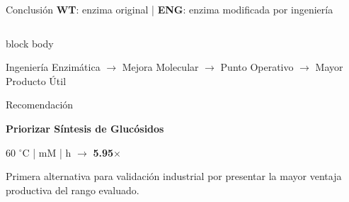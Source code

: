 \begin{frame}[label=conclusion]{Conclusión \hfill{\tiny\color{TextoSuave}\textbf{WT}: enzima original \quad | \quad \textbf{ENG}: enzima modificada por ingeniería}}
\begin{columns}[T,onlytextwidth]
\end{columns}

\vspace{0.04cm}

\begin{beamercolorbox}[
    wd=\linewidth,
    sep=0.08cm,
    rounded=true,
    center
]{block body}
\scriptsize\bfseries\color{CianClaro}

Ingeniería Enzimática
$\rightarrow$
Mejora Molecular
$\rightarrow$
Punto Operativo
$\rightarrow$
Mayor Producto Útil

\end{beamercolorbox}

\vspace{0.04cm}

\begin{block}{Recomendación}
\centering
\scriptsize\bfseries

\textbf{Priorizar Síntesis de Glucósidos}

\vspace{0.02cm}

60 $^{\circ}$C
\quad |  mM
\quad |  h
\quad $\rightarrow$ \quad
\textbf{5.95$\times$}

\vspace{0.02cm}

{\tiny
Primera alternativa para validación industrial por presentar
la mayor ventaja productiva del rango evaluado.
}
\end{block}

\vfill


\end{frame}